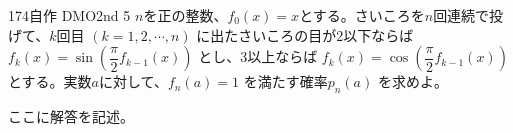 \begin{thm}{174}{}{自作 DMO2nd 5}
 $n$を正の整数、$f_0(x)=x$とする。さいころを$n$回連続で投げて、$k$回目 $(k=1, 2, \cdots, n)$ に出たさいころの目が2以下ならば $f_k(x)=\sin \left(\dfrac{\pi}{2}f_{k-1}(x)\right)$ とし、3以上ならば $f_k(x)=\cos\left(\dfrac{\pi}{2}f_{k-1}(x)\right)$ とする。実数$a$に対して、$f_n(a)=1$ を満たす確率$p_n(a)$ を求めよ。
\end{thm}

ここに解答を記述。